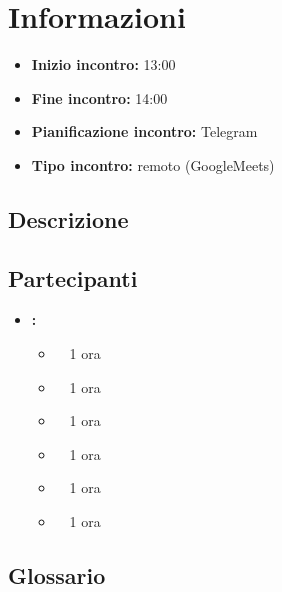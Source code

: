 \section{Informazioni}
\begin{itemize}
	\item \textbf{Inizio incontro:} 13:00
	\item \textbf{Fine incontro:} 14:00
	\item \textbf{Pianificazione incontro:} Telegram
	\item \textbf{Tipo incontro:} remoto (GoogleMeets)
\end{itemize}

\subsection{Descrizione}
\DocDescription

\subsection{Partecipanti}

\begin{itemize}
	\item \textbf{\GroupName:}
	\begin{itemize}
		\item \tommaso \ \rightarrow\ 1 ora
		\item \marco \ \rightarrow\ 1 ora
		\item \riccardo \ \rightarrow\ 1 ora
		\item \raul \ \rightarrow\ 1 ora
		\item \martina \ \rightarrow\ 1 ora
		\item \sebastiano \ \rightarrow\ 1 ora
	\end{itemize}
\end{itemize}

\subsection{Glossario}
\GlossarioIntroduzione

\clearpage